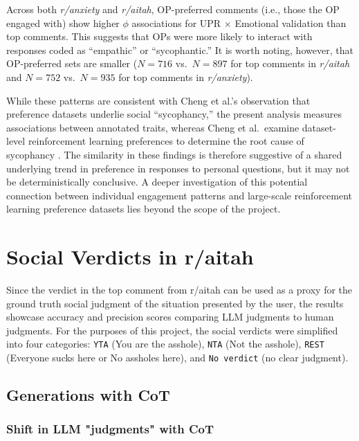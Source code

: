 Across both \textit{r/anxiety} and \textit{r/aitah}, OP-preferred comments (i.e., those the OP engaged with) show higher $\phi$ associations for UPR $\times$ Emotional validation than top comments. This suggests that OPs were more likely to interact with responses coded as ``empathic'' or ``sycophantic.'' It is worth noting, however, that OP-preferred sets are smaller ($N = 716$ vs.\ $N = 897$ for top comments in \textit{r/aitah} and $N = 752$ vs.\ $N = 935$ for top comments in \textit{r/anxiety}).

While these patterns are consistent with Cheng et al.'s observation that preference datasets underlie social ``sycophancy,'' the present analysis measures associations between annotated traits, whereas Cheng et al.\ examine dataset-level reinforcement learning preferences to determine the root cause of sycophancy \cite{cheng-etal-sycophancy}. The similarity in these findings is therefore suggestive of a shared underlying trend in preference in responses to personal questions, but it may not be deterministically conclusive. A deeper investigation of this potential connection between individual engagement patterns and large-scale reinforcement learning preference datasets lies beyond the scope of the project.

\section{Social Verdicts in r/aitah}

Since the verdict in the top comment from r/aitah can be used as a proxy for the ground truth social judgment of the situation presented by the user, the results showcase accuracy and precision scores comparing LLM judgments to human judgments. For the purposes of this project, the social verdicts were simplified into four categories: \texttt{YTA} (You are the asshole), \texttt{NTA} (Not the asshole), \texttt{REST} (Everyone sucks here or No assholes here), and \texttt{No verdict} (no clear judgment).

\subsection{Generations with CoT}

\subsubsection{Shift in LLM "judgments" with CoT}\label{sec:posterchild2.2}

